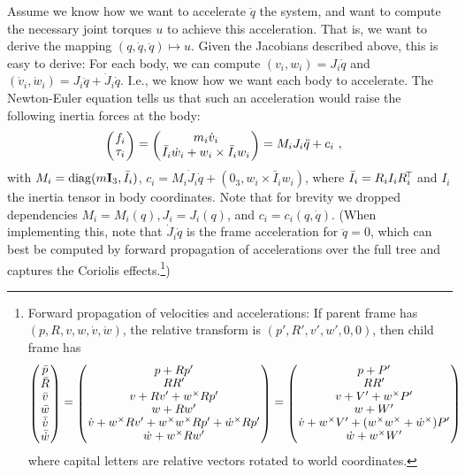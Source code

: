 Assume we know how we want to accelerate $\ddot q$ the system, and
want to compute the necessary joint torques $u$ to achieve this acceleration. That
is, we want to derive the mapping $(q,\dot
q, \ddot q) \mapsto u$. Given the
Jacobians described above, this is easy to derive:
For each body, we can compute
$(v_i,w_i) = J_i \dot q$ and $(\dot v_i, \dot w_i) = J_i \ddot
q + \dot J_i \dot q$. I.e., we know how we want each body to accelerate. The
Newton-Euler equation tells us that such an acceleration would raise the
following inertia forces at the body:
\begin{align}
\mat{c}{f_i \\ \tau_i}
&= \mat{c}{m_i \dot v_i \\\bar I_i \dot w_i + w_i\times \bar I_i w_i}
 = M_i J_i \ddot q + c_i ~,
\end{align}
with $M_i = {\rm diag}(m {\rm\bf I}_3, \bar I_i)$, $c_i = M_i \dot J_i \dot q + (0_3, w_i\times \bar I_i w_i)$, where $\bar I_i = R_i I_i R_i^{\!\top\!}$ and $I_i$ the inertia tensor in
body coordinates. Note that for brevity we dropped dependencies $M_i = M_i(q), J_i = J_i(q)$, and $c_i = c_i(q,\dot q)$. (When implementing this, note that 
$\dot J_i \dot q$ is the frame acceleration for $\ddot q=0$, which can best be computed by forward propagation of accelerations over the full tree and captures  the Coriolis effects.\footnote{Forward propagation of velocities and accelerations: If parent frame has $(p,R,v,w,\dot v,\dot w)$, the relative transform is $(p',R', v',w',0,0)$, then child frame has
\begin{align}
\mat{c}{\bar p \\ \bar R \\ \bar v \\  \bar w \\ \bar{\dot v} \\ \bar{\dot w}}
&=
\mat{c}{
p+Rp' \\
R R' \\
v + Rv' + w^\times R p' \\
w + R w'\\
\dot v + w^\times R v' + w^\times w^\times R p' + \dot w^\times R p'\\
\dot w + w^\times R w'}
=
\mat{c}{
p+P' \\
R R' \\
v + V' + w^\times P' \\
w + W'\\
\dot v + w^\times V' + (w^\times w^\times + \dot w^\times ) P'\\
\dot w + w^\times W'}
\end{align}
where capital letters are relative vectors rotated to world coordinates.
})

